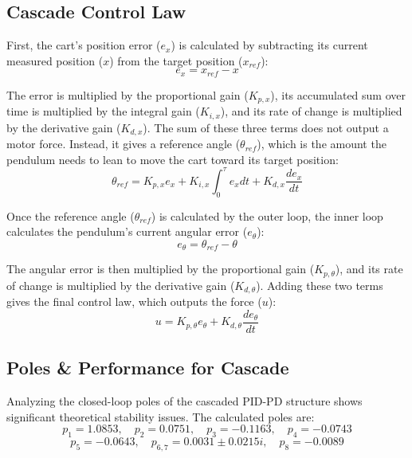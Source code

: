 \subsection{Cascade Control Law}
First, the cart's position error ($e_x$) is calculated by subtracting its current measured position ($x$) from the target position ($x_{ref}$):
\begin{equation}
	\label{Cart position error}
	e_x = x_{ref} - x
\end{equation}

The error is multiplied by the proportional gain ($K_{p,x}$), its accumulated sum over time is multiplied by the integral gain ($K_{i,x}$), and its rate of change is multiplied by the derivative gain ($K_{d,x}$). The sum of these three terms does not output a motor force. Instead, it gives a reference angle ($\theta_{ref}$), which is the amount the pendulum needs to lean to move the cart toward its target position:
\begin{equation}
	\label{Cart PID}
	\theta_{ref} = K_{p,x} e_x + K_{i,x} \int_{0}^{\tau} e_x dt + K_{d,x} \frac{d e_x}{dt}
\end{equation}

Once the reference angle ($\theta_{ref}$) is calculated by the outer loop, the inner loop calculates the pendulum's current angular error ($e_\theta$):
\begin{equation}
	\label{Pendulum angle error}
	e_\theta = \theta_{ref} - \theta
\end{equation}

The angular error is then multiplied by the proportional gain ($K_{p,\theta}$), and its rate of change is multiplied by the derivative gain ($K_{d,\theta}$). Adding these two terms gives the final control law, which outputs the force ($u$):
\begin{equation}
	\label{Pendulum PD}
	u = K_{p,\theta} e_\theta + K_{d,\theta} \frac{d e_\theta}{dt}
\end{equation}

\subsection{Poles \& Performance for Cascade}
Analyzing the closed-loop poles of the cascaded PID-PD structure shows significant theoretical stability issues. The calculated poles are:
\begin{equation}
	p_1 = 1.0853, \quad p_2 = 0.0751, \quad p_3 = -0.1163, \quad p_4 = -0.0743
\end{equation}
$$
	p_5 = -0.0643, \quad p_{6,7} = 0.0031 \pm 0.0215i, \quad p_8 = -0.0089
$$


